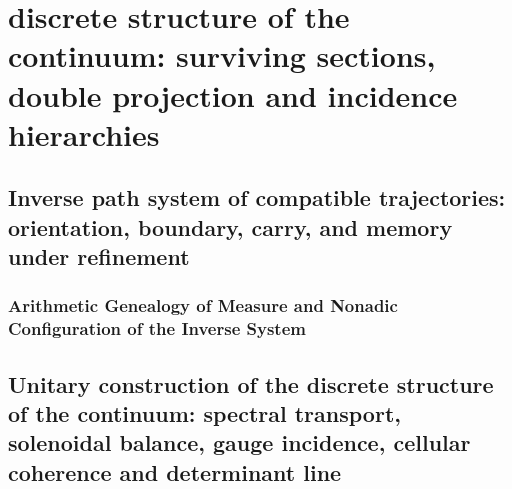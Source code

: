 

\part{discrete structure of the continuum: surviving sections, double projection and incidence hierarchies}

\chapter{Inverse path system of compatible trajectories: orientation, boundary, carry, and memory under refinement}
\label{chap:sucesor-102-04}
\label{owner:sucesor-102-04b-cadena-conjunta-inicio}
\section{Arithmetic Genealogy of Measure and Nonadic Configuration of the Inverse System}
\begin{HMTScientificOwnerSubordinated}

\end{HMTScientificOwnerSubordinated}















\chapter{Unitary construction of the discrete structure of the continuum: spectral transport, solenoidal balance, gauge incidence, cellular coherence and determinant line}
\label{chap:sucesor-102-05}
\label{owner:sucesor-102-04b1-04b2-unicos}












